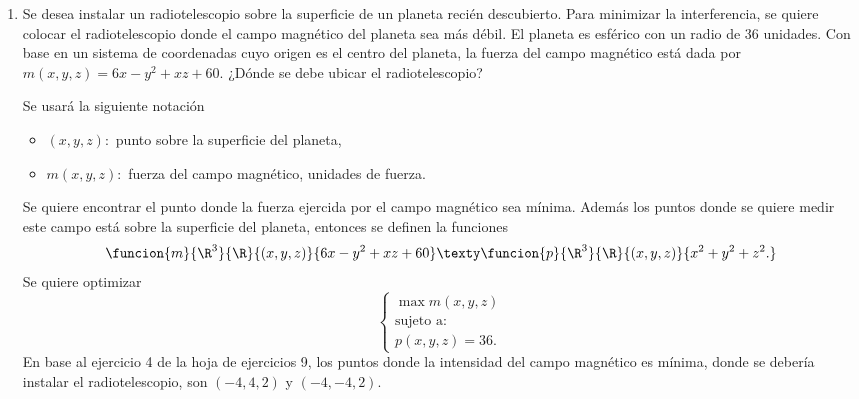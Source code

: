 \documentclass[a4,11pt]{aleph-examen}
\begin{document}
\begin{preguntas}
\begin{respuesta}
\begin{respuesta}
\begin{respuesta}
\begin{enumerate}
\begin{respuesta}
    Notemos que se debe verificar que $x+y+z=a$ siendo su producto $xyz$ el máximo. Se definen entonces:
    \[
         \funcion{f}{\R^3}{\R}{(x,y,z)}{xyz}
    \]
  	y,
	\[
        \funcion{g}{\R^3}{\R}{(x,y,z)}{x + y+ z.}
    \] 
    A partir de lo cual, buscamos resolver el siguiente problema 
    \[
        \begin{cases}
        \begin{array}{c}
		\max f(x,y,z)\\
		\text{sujeto  a:}\\
			g(x,y,z)=a.\\		
		\end{array}
        \end{cases} 
    \]
    En base al ejercicio 2 de la hoja de ejercicios 9, se puede concluir que los sumandos de un número natural $a> 0$, cuyo producto $xyz$ es máximo son $x=y=z=\dfrac{a}{3}$.
\end{respuesta}


\item Se desea instalar un radiotelescopio sobre la superficie de un planeta recién descubierto. Para minimizar la interferencia, se quiere colocar el radiotelescopio donde el campo magnético del planeta sea más débil. El planeta es esférico con un radio de 36 unidades. Con base en un sistema de coordenadas cuyo origen es el centro del planeta, la fuerza del campo magnético está dada por $m(x,y,z)=6x-y^2+xz+60$. ¿Dónde se debe ubicar el radiotelescopio?

\begin{respuesta}
    Se usará la siguiente notación
    \begin{itemize}
        \item $(x,y,z):$ punto sobre la superficie del planeta,
        \item $m(x,y,z):$ fuerza del campo magnético, unidades de fuerza.
    \end{itemize}
    Se quiere encontrar el punto donde la fuerza ejercida por el campo magnético sea mínima. Además los puntos donde se quiere medir este campo está sobre la superficie del planeta, entonces se definen la funciones
    \[
        \funcion{m}{\R^3}{\R}{(x,y,z)}{6x-y^2+xz+60} \texty \funcion{p}{\R^3}{\R}{(x,y,z)}{x^2+y^2+z^2.}
    \]
    Se quiere optimizar
    \[
        \begin{cases}
            \max m(x,y,z)\\
            \text{sujeto  a:}\\
            p(x,y,z)=36.
        \end {cases}
    \]
    En base al ejercicio 4 de la hoja de ejercicios 9, los puntos donde la intensidad del campo magnético es mínima, donde se debería instalar el radiotelescopio, son $(-4,4,2)$ y $(-4,-4,2)$.
    

\end{respuesta}
\end{enumerate}
\end{respuesta}
\end{respuesta}
\end{respuesta}
\end{preguntas}
\end{document}
